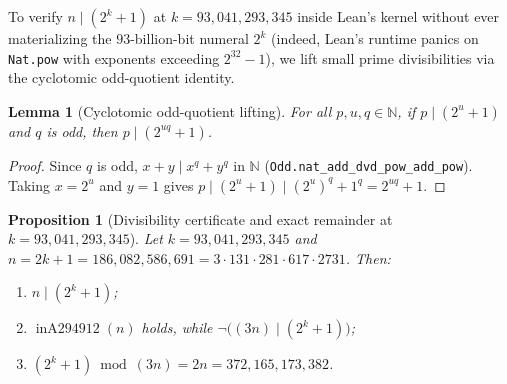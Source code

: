 \documentclass[11pt]{article}
\newtheorem{proposition}[theorem]{Proposition}
\newtheorem{lemma}[theorem]{Lemma}
\theoremstyle{definition}
\newcommand{\N}{\mathbb{N}}
\newcommand{\inA}{\operatorname{inA294912}}
\begin{document}
To verify $n \mid (2^k + 1)$ at $k = 93{,}041{,}293{,}345$ inside Lean's kernel without ever materializing the $93$-billion-bit numeral $2^k$ (indeed, Lean's runtime panics on \texttt{Nat.pow} with exponents exceeding $2^{32} - 1$), we lift small prime divisibilities via the cyclotomic odd-quotient identity.

\begin{lemma}[Cyclotomic odd-quotient lifting]
\label{lem:odd-quot}
For all $p, u, q \in \N$, if $p \mid (2^u + 1)$ and $q$ is odd, then $p \mid (2^{uq} + 1)$.
\end{lemma}

\begin{proof}
Since $q$ is odd, $x + y \mid x^q + y^q$ in $\N$ (\texttt{Odd.nat\_add\_dvd\_pow\_add\_pow}). Taking $x = 2^u$ and $y = 1$ gives $p \mid (2^u + 1) \mid (2^u)^q + 1^q = 2^{uq} + 1$.
\end{proof}

\begin{proposition}[Divisibility certificate and exact remainder at $k = 93{,}041{,}293{,}345$]
\label{prop:witness-cert}
Let $k = 93{,}041{,}293{,}345$ and $n = 2k + 1 = 186{,}082{,}586{,}691 = 3 \cdot 131 \cdot 281 \cdot 617 \cdot 2731$. Then:
\begin{enumerate}
\item[\textup{(a)}] $n \mid (2^k + 1)$;
\item[\textup{(b)}] $\inA(n)$ holds, while $\neg\bigl((3n) \mid (2^k + 1)\bigr)$;
\item[\textup{(c)}] $(2^k + 1) \bmod (3n) = 2n = 372{,}165{,}173{,}382$.
\end{enumerate}
\end{proposition}
\end{document}
